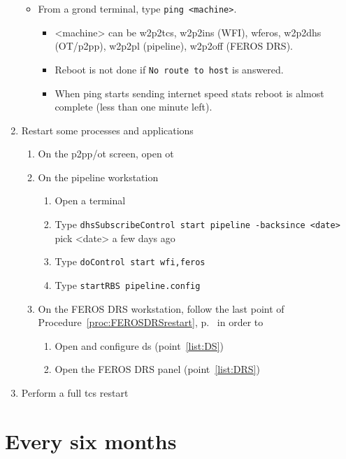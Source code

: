\documentclass[11pt,fleqn]{book}
\def\procref#1{Procedure~\ref{proc:#1}, p.~\pageref{proc:#1}}
\begin{document}
\begin{enumerate}
\begin{itemize}
        \item From a grond terminal, type \texttt{ping <machine>}.
             \begin{itemize}
             \item <machine> can be \gls{w2p2tcs}, \gls{w2p2ins} (WFI), \gls{wferos}, \gls{w2p2dhs} (OT/p2pp), \gls{w2p2pl} (pipeline), \gls{w2p2off} (FEROS DRS). 
             \item Reboot is not done if \texttt{No route to host} is answered.
             \item When ping starts sending internet speed stats reboot is almost complete (less than one minute left).
             \end{itemize}
    \end{itemize}
\item Restart some processes and applications
    \begin{enumerate}
        \item On the \gls{p2pp}/\gls{ot} screen, open \gls{ot}
        \item On the pipeline workstation
             \begin{enumerate}
                \item Open  a terminal
                \item Type \texttt{dhsSubscribeControl start pipeline -backsince <date>}\\
            pick <date> a few days ago
                \item Type \texttt{doControl start wfi,feros}
                \item Type \texttt{startRBS pipeline.config}
             \end{enumerate}
        \item On the FEROS DRS workstation, follow the last point of \procref{FEROSDRSrestart} in order to
             \begin{enumerate}
                \item Open and configure \gls{ds} (point~\ref{list:DS})
                \item Open the FEROS DRS panel (point~\ref{list:DRS})
             \end{enumerate}
    \end{enumerate}
\item \label{list:soft:tcs}Perform a full \gls{tcs} restart
\end{enumerate}

\section{Every six months}
\end{document}
